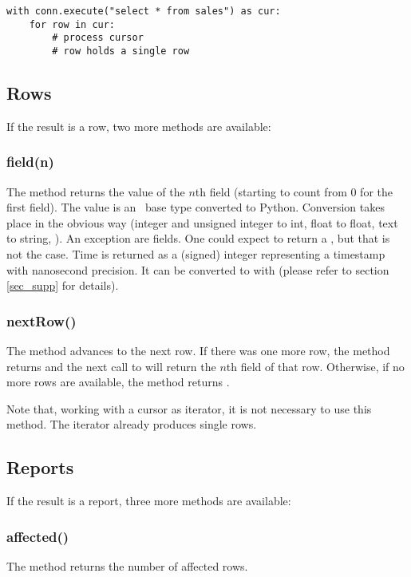 \begin{python}
\begin{lstlisting}
with conn.execute("select * from sales") as cur:
    for row in cur:
        # process cursor
        # row holds a single row
\end{lstlisting}
\end{python}

\subsection{Rows}
If the result is a row,
two more methods are available:

\subsubsection{field(n)}
The method returns the value
of the $n$th field (starting to count
from 0 for the first field).
The value is an \sql\ base type
converted to Python.
Conversion takes place in the obvious way
(integer and unsigned integer to int,
 float to float, text to string, \etc).
An exception are  fields.
One could expect  to return
a , but that is not the case.
Time is returned as a (signed) integer
representing a  timestamp
with nanosecond precision.
It can be converted to  with 
(please refer to section \ref{sec_supp}
for details).

\subsubsection{nextRow()}
The method advances to the next row.
If there was one more row, the method
returns  and the next call
to  will return the
$n$th field of that row.
Otherwise, if no more rows are available,
the method returns .

Note that, working with a cursor
as iterator, it is not necessary
to use this method. The iterator
already produces single rows.

\subsection{Reports}
If the result is a report,
three more methods are available:

\subsubsection{affected()}
The method returns the number of affected rows.

